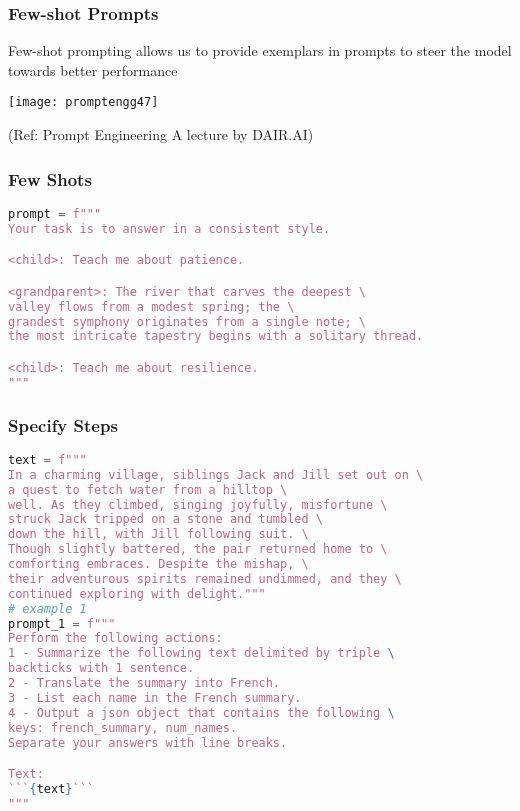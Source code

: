 \begin{frame}[fragile]\frametitle{Few-shot Prompts}

Few-shot prompting allows us to provide exemplars in 
prompts to steer the model towards better performance


\begin{center}
\texttt{[image: promptengg47]}

{\tiny (Ref: Prompt Engineering A lecture by DAIR.AI)}

\end{center}
\end{frame}


\begin{frame}[fragile]\frametitle{Few Shots}


\begin{lstlisting}[language=Python]
prompt = f"""
Your task is to answer in a consistent style.

<child>: Teach me about patience.

<grandparent>: The river that carves the deepest \ 
valley flows from a modest spring; the \ 
grandest symphony originates from a single note; \ 
the most intricate tapestry begins with a solitary thread.

<child>: Teach me about resilience.
"""
\end{lstlisting}
		
		
\end{frame}

\begin{frame}[fragile]\frametitle{Specify Steps}

{\tiny
\begin{lstlisting}[language=Python]
text = f"""
In a charming village, siblings Jack and Jill set out on \ 
a quest to fetch water from a hilltop \ 
well. As they climbed, singing joyfully, misfortune \ 
struck Jack tripped on a stone and tumbled \ 
down the hill, with Jill following suit. \ 
Though slightly battered, the pair returned home to \ 
comforting embraces. Despite the mishap, \ 
their adventurous spirits remained undimmed, and they \ 
continued exploring with delight."""
# example 1
prompt_1 = f"""
Perform the following actions: 
1 - Summarize the following text delimited by triple \
backticks with 1 sentence.
2 - Translate the summary into French.
3 - List each name in the French summary.
4 - Output a json object that contains the following \
keys: french_summary, num_names.
Separate your answers with line breaks.

Text:
```{text}```
"""
\end{lstlisting}

}	
		
\end{frame}

